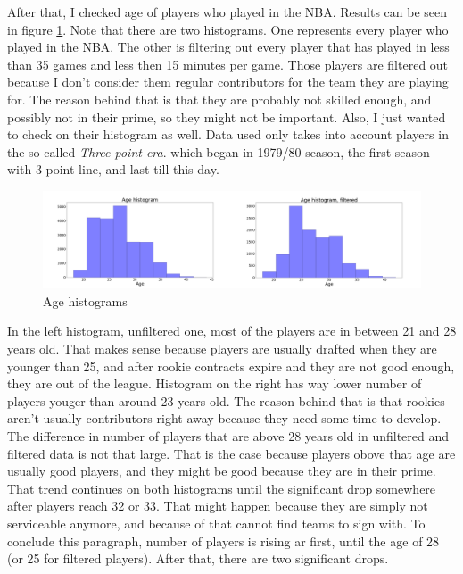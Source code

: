 \documentclass[a4paper]{article}
\begin{document}
After that, I checked age of players who played in the NBA. Results can be seen in figure \ref{plt:age_hist}. Note that there are two histograms. One represents every player who played in the NBA. The other is filtering out every player that has played in less than 35 games and less then 15 minutes per game. Those players are filtered out because I don't consider them regular contributors for the team they are playing for. The reason behind that is that they are probably not skilled enough, and possibly not in their prime, so they might not be important. Also, I just wanted to check on their histogram as well. Data used only takes into account players in the so-called \textit{Three-point era}. which began in 1979/80 season, the first season with 3-point line, and last till this day.

\begin{figure}[h!]
\begin{center}
\includegraphics[scale=0.3]{age_histograms.png}
\end{center}
\caption{Age histograms}
\label{plt:age_hist}
\end{figure}


In the left histogram, unfiltered one, most of the players are in between 21 and 28 years old. That makes sense because players are usually drafted when they are younger than 25, and after rookie contracts expire and they are not good enough, they are out of the league. Histogram on the right has way lower number of players youger than around 23 years old. The reason behind that is that rookies aren't usually contributors right away because they need some time to develop.   The difference in number of players that are above 28 years old in unfiltered and filtered data is not that large. That is the case because players obove that age are usually good players, and they might be good because they are in their prime. That trend continues on both histograms until the significant drop somewhere after players reach 32 or 33. That might happen because they are simply not serviceable anymore, and because of that cannot find teams to sign with. 
To conclude this paragraph, number of players is rising ar first, until the age of 28 (or 25 for filtered players). After that, there are two significant drops.
\end{document}
